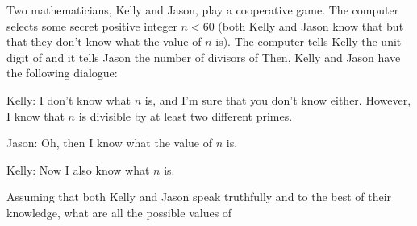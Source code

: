 Two mathematicians, Kelly and Jason, play a cooperative game. The computer selects some secret positive integer $ n < 60$ (both Kelly and Jason know that  but that they don't know what the value of $ n$ is). The computer tells Kelly the unit digit of  and it tells Jason the number of divisors of  Then, Kelly and Jason have the following dialogue:

Kelly: I don't know what $ n$ is, and I'm sure that you don't know either. However, I know that $ n$ is divisible by at least two different primes.

Jason: Oh, then I know what the value of $ n$ is.

Kelly: Now I also know what $ n$ is.

Assuming that both Kelly and Jason speak truthfully and to the best of their knowledge, what are all the possible values of 